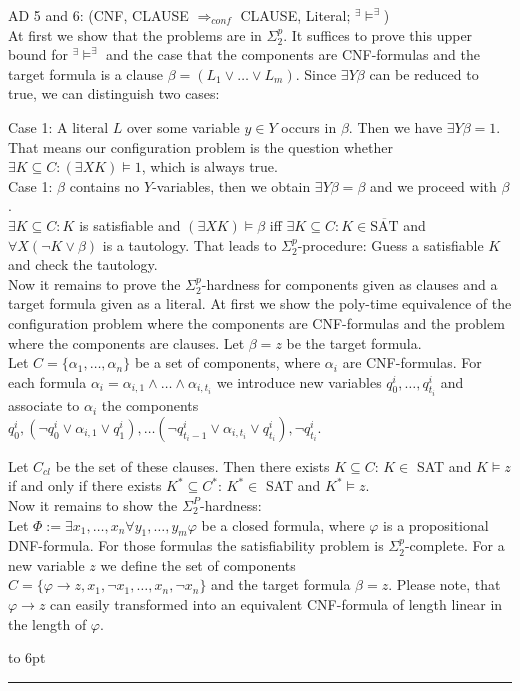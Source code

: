 \documentclass[12pt]{article}
\newcommand{\AMB}{\mbox{$^\exists\!\!\models^\exists$}}
\newenvironment{proof}{\parindent=0pt{\bf Proof: }}{
   \hspace*{\fill}\hbox to 6pt{\leaders\hrule width 6pt height 6pt\hfill}\par}
\begin{document}
\begin{proof}
AD 5 and 6: (CNF, CLAUSE $\Longrightarrow_{conf}$ CLAUSE, Literal; \AMB)\\
At first we show that the problems are in $\Sigma^p_2$. It suffices to prove this upper bound for \AMB
and the case that the components are CNF-formulas and the target formula is a clause
$\beta =(L_1 \vee \ldots \vee L_m)$. Since $\exists Y \beta$ can be reduced to true, we can distinguish two cases:

Case 1: A literal $L$ over some variable $y \in Y$ occurs in $\beta$. Then we have $\exists Y \beta = 1$. That means our configuration problem is the question whether
$\exists K \subseteq C: (\exists X K) \models 1$, which is always true.\\

Case 1: $\beta$ contains no $Y$-variables, then we obtain $\exists Y \beta = \beta$ and we proceed with $\beta$.\\
$\exists K \subseteq C: K$ is satisfiable and $(\exists X K) \models \beta$ iff
$\exists K \subseteq C: K \in \overline{\mbox{SAT}}$ and $\forall X (\neg K \vee \beta)$ is a tautology.
That leads to $\Sigma^p_2$-procedure: Guess a satisfiable $K$ and check the tautology.\\

Now it remains to prove the $\Sigma^p_2$-hardness for components given  as clauses and a target formula given as a literal.
At first we show the poly-time equivalence of the configuration problem where the components are CNF-formulas and
the problem where the components are clauses.
Let $\beta=z$ be the target formula.\\
Let $C=\{\alpha_1, \ldots, \alpha_n\}$ be a set of components, where $\alpha_i$ are CNF-formulas.
For each formula $\alpha_i= \alpha_{i,1} \wedge \ldots \wedge \alpha_{i,t_i}$  we introduce new variables $q^i_0, \ldots, q^i_{t_i}$ and associate to $\alpha_i$ the components $q^i_0, (\neg q^i_0 \vee \alpha_{i,1} \vee q^i_1), \ldots
(\neg q^i_{t_i-1} \vee \alpha_{i,t_i} \vee q^i_{t_i}), \neg q^i_{t_i}$.

Let $C_{cl}$ be the set of these clauses. Then there exists $K \subseteq C$: $K \in$ SAT and $K \models z$ if and only if
there exists $K^* \subseteq C^*$: $K^* \in$ SAT and $K^* \models z$.\\

Now it remains to show the $\Sigma_2^P$-hardness:\\
Let $\Phi:= \exists x_1, \ldots, x_n \forall y_1, \ldots, y_m \varphi$ be a closed formula, where
$\varphi$ is a propositional DNF-formula. For those formulas the satisfiability problem is $\Sigma^p_2$-complete.
For a new variable $z$ we define the set of components\\
$C= \{ \varphi \rightarrow z, x_1, \neg x_1, \ldots, x_n, \neg x_n\}$ and the target formula $\beta=z$. Please note, that $\varphi \rightarrow z$ can easily transformed into an equivalent CNF-formula of length linear in the length of
$\varphi$.


\end{proof}
\end{document}
